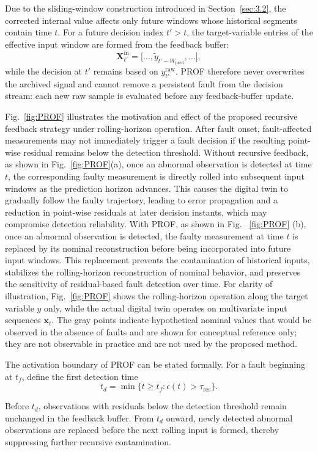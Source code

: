 \documentclass[a4paper,10pt]{cas-sc}%
\newcommand{\rev}[1]{#1}
\newcommand{\roundtworev}[1]{\textcolor{roundtwored}{#1}}
\newenvironment{revision}{}{}
\begin{document}
\rev{Due to the sliding-window construction introduced in Section~\ref{sec:3.2}, the corrected internal value affects only future windows whose historical segments contain time $t$. For a future decision index $t'>t$, the target-variable entries of the effective input window are formed from the feedback buffer:}
\begin{equation}
	{\boldsymbol{X}_{t'}^{\mathrm{in}}
	=\big[\ldots,\tilde y_{t'-W_{\mathrm{pred}}},\ldots\big],}
	\label{eq:recursive_window}
\end{equation}
\rev{while the decision at $t'$ remains based on $y_{t'}^{\mathrm{raw}}$. PROF therefore never overwrites the archived signal and cannot remove a persistent fault from the decision stream: each new raw sample is evaluated before any feedback-buffer update.}

Fig.~\ref{fig:PROF} illustrates the motivation and effect of the proposed recursive feedback strategy under rolling-horizon operation. After fault onset, fault-affected measurements may not immediately trigger a fault decision if the resulting point-wise residual remains below the detection threshold. Without recursive feedback, as shown in Fig.~\ref{fig:PROF}(a), \roundtworev{once an abnormal observation is detected} at time $t$, the corresponding faulty measurement is directly rolled into subsequent input windows as the prediction horizon advances. This causes the digital twin to gradually follow the faulty trajectory, leading to error propagation and a reduction in point-wise residuals at later decision instants, which may compromise detection reliability.
With PROF, as shown in Fig. ~\ref{fig:PROF} (b), \roundtworev{once an abnormal observation is detected}, the faulty measurement at time $t$ is replaced by its nominal reconstruction before being incorporated into future input windows. This replacement prevents the contamination of historical inputs, stabilizes the rolling-horizon reconstruction of nominal behavior, and preserves the sensitivity of residual-based fault detection over time.
For clarity of illustration, Fig.~\ref{fig:PROF} shows the rolling-horizon operation along the target variable $y$ only, while the actual digital twin operates on multivariate input sequences $\boldsymbol{x}_t$. The gray points indicate hypothetical nominal values that would be observed in the absence of faults and are shown for conceptual reference only; they are not observable in practice and are not used by the proposed method.

\begin{revision}
	The activation boundary of PROF can be stated formally. For a fault beginning at $t_f$, define the first detection time
	\begin{equation}
		t_d=\min\{t\geq t_f:\epsilon(t)>\tau_{\mathrm{res}}\}.
		\label{eq:first_detection_time}
	\end{equation}

	\roundtworev{Before $t_d$, observations with residuals below the detection threshold remain unchanged in the feedback buffer. From $t_d$ onward, newly detected abnormal observations are replaced before the next rolling input is formed, thereby suppressing further recursive contamination.}
\end{revision}
\end{document}
